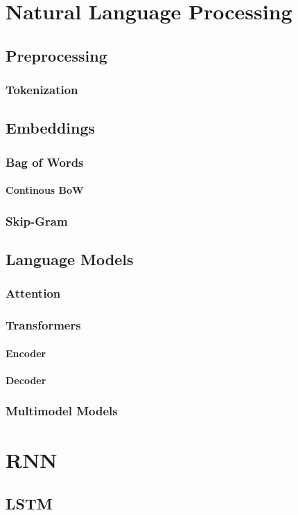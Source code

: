 \section{Natural Language Processing}
\subsection{Preprocessing}
\subsubsection{Tokenization}
\subsection{Embeddings}
\subsubsection{Bag of Words}
\paragraph{Continous BoW}
\subsubsection{Skip-Gram}
\subsection{Language Models}
\subsubsection{Attention}
\subsubsection{Transformers}
\paragraph{Encoder}
\paragraph{Decoder}
\subsubsection{Multimodel Models}



\section{RNN} %
\subsection{LSTM}
